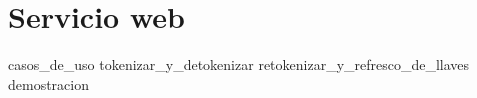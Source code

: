 %
%
%

\section{Servicio web}

{casos_de_uso}
{tokenizar_y_detokenizar}
{retokenizar_y_refresco_de_llaves}
{demostracion}
